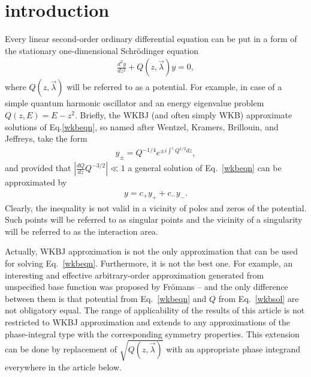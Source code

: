 \documentclass[aps,prl,preprint,superscriptaddress]{revtex4}
\begin{document}
\pacs{}

\maketitle

\section{introduction \label{INTRO}}
Every linear second-order ordinary differential equation can be put in a form of the stationary one-dimensional Schr\"odinger equation
\begin{eqnarray}
\frac{d^2y}{dz^2} + Q(z,\vec{\lambda})y = 0,   \label{wkbeqn}
\end{eqnarray}
where \mbox{$Q(z,\vec{\lambda})$} will be referred to as a potential. For example, in case of a simple quantum harmonic oscillator and an energy eigenvalue problem \mbox{$Q(z,E)=E-z^2$}. Briefly, the WKBJ (and often simply WKB) 
approximate solutions of Eq.\ref{wkbeqn}, so named after
Wentzel, Kramers, Brillouin, and Jeffreys\cite{wkbj}, take the form
\begin{eqnarray}
y_\pm = Q^{-1/4} e^{\pm i \int^z Q^{1/2} dz},   \label{wkbsol}
\end{eqnarray}
and provided that
$\left|\frac{dQ}{dz}Q^{-3/2}\right| \ll 1 $
a general solution of Eq.~\ref{wkbeqn} can be approximated by
\begin{eqnarray}
y = c_+y_+ + c_-y_-.    \label{gensol}
\end{eqnarray}
Clearly, the inequality is not valid in a vicinity of poles and zeros of the potential. Such points will be referred to as singular points and the vicinity of a singularity will be referred to as the interaction area.

Actually, WKBJ approximation is not the only approximation that can be used for solving Eq.~\ref{wkbeqn}. Furthermore, it is not the best one. For example, an interesting and effective arbitrary-order approximation generated from unspecified base function was proposed by Fr\"omans \cite{fromanA,fromanB} – and the only difference between them is that potential from Eq.~\ref{wkbeqn} and $Q$ from
Eq.~\ref{wkbsol} are not obligatory equal. The range of applicability of the results of this article is not restricted to WKBJ approximation and extends to any approximations of the phase-integral type with the corresponding symmetry properties. This extension can be done by replacement of $\sqrt{Q(z,\vec{\lambda})}$ with an appropriate phase integrand everywhere in the article below.  
\end{document}
